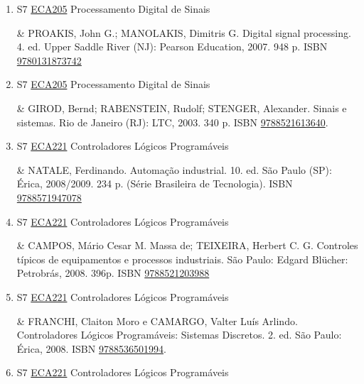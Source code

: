 \documentclass[12pt,a4paper]{book}
\begin{document}
\begin{enumerate}
 \item S7 \hyperref[PUD:ECA205]{ECA205} Processamento Digital de Sinais

&  PROAKIS, John G.;  MANOLAKIS, Dimitris G.  Digital signal processing.  4. ed.  Upper Saddle River (NJ): Pearson Education, 2007.  948 p.  ISBN \href{http://www.isbnsearch.org/isbn/9780131873742}{9780131873742} 
 

 \item S7 \hyperref[PUD:ECA205]{ECA205} Processamento Digital de Sinais

&  GIROD, Bernd;  RABENSTEIN, Rudolf;  STENGER, Alexander.  Sinais e sistemas.  Rio de Janeiro (RJ): LTC, 2003.  340 p.  ISBN \href{http://www.bn.br/site/pages/servicosProfissionais/agenciaISBN/isbnBusca/FbnBuscaISBNCatalogo.asp?pField=ISBN&pIntPagina=1&pISBN=21613640&nidbISBN=true&hidbISBN=true}{9788521613640}.
 \item S7 \hyperref[PUD:ECA221]{ECA221} Controladores Lógicos Programáveis

&  NATALE, Ferdinando.  Automação industrial.  10. ed.  São Paulo (SP): Érica, 2008/2009.  234 p.  (Série Brasileira de Tecnologia).  ISBN \href{http://www.bn.br/site/pages/servicosProfissionais/agenciaISBN/isbnBusca/FbnBuscaISBNCatalogo.asp?pField=ISBN&pIntPagina=1&pISBN=71947078&nidbISBN=true&hidbISBN=true}{9788571947078}
 

 \item S7 \hyperref[PUD:ECA221]{ECA221} Controladores Lógicos Programáveis

&  CAMPOS, Mário Cesar M.  Massa de;  TEIXEIRA, Herbert C.  G.  Controles típicos de equipamentos e processos industriais.  São Paulo: Edgard Blücher: Petrobrás, 2008.  396p.   ISBN \href{http://www.bn.br/site/pages/servicosProfissionais/agenciaISBN/isbnBusca/FbnBuscaISBNCatalogo.asp?pField=ISBN&pIntPagina=1&pISBN=21203988&nidbISBN=true&hidbISBN=true}{9788521203988} 
 

 \item S7 \hyperref[PUD:ECA221]{ECA221} Controladores Lógicos Programáveis

&  FRANCHI, Claiton Moro e CAMARGO, Valter Luís Arlindo.  Controladores Lógicos Programáveis: Sistemas Discretos.  2.  ed.  São Paulo: Érica, 2008.  ISBN \href{http://www.bn.br/site/pages/servicosProfissionais/agenciaISBN/isbnBusca/FbnBuscaISBNCatalogo.asp?pField=ISBN&pIntPagina=1&pISBN=36501994&nidbISBN=true&hidbISBN=true}{9788536501994}.
 \item S7 \hyperref[PUD:ECA221]{ECA221} Controladores Lógicos Programáveis


\end{enumerate}
\end{document}
